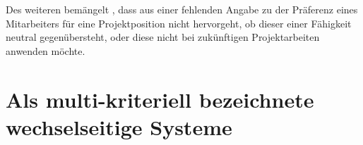 Des weiteren bemängelt \textcite[S. 69]{link:booklet}, dass aus einer fehlenden Angabe zu der Präferenz eines Mitarbeiters für eine Projektposition nicht hervorgeht, ob dieser einer Fähigkeit neutral gegenübersteht, oder diese nicht bei zukünftigen Projektarbeiten anwenden möchte.

\section{Als multi-kriteriell bezeichnete wechselseitige Systeme}



